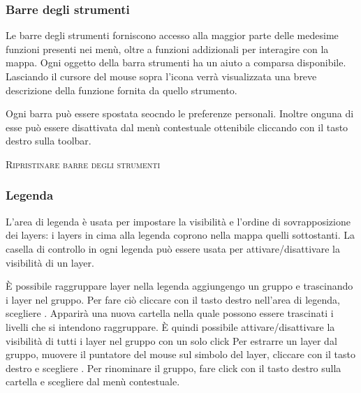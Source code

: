 
\subsubsection{Barre degli strumenti}\label{label_toolbars}

Le barre degli strumenti forniscono accesso alla maggior parte delle medesime funzioni presenti nei menù,
oltre a funzioni addizionali per interagire con la mappa. Ogni oggetto della barra strumenti
ha un aiuto a comparsa disponibile. Lasciando il cursore del mouse sopra l'icona verrà
visualizzata una breve descrizione della funzione fornita da quello strumento.

Ogni barra può essere spostata seocndo le preferenze personali. Inoltre onguna di esse
può essere disattivata dal menù contestuale ottenibile cliccando con il tasto destro
sulla toolbar.

\begin{Tip}
\caption{\textsc{Ripristinare barre degli strumenti}} 
\end{Tip}

\subsubsection{Legenda}\label{label_legend}

L'area di legenda è usata per impostare la visibilità e l'ordine di sovrapposizione dei layers:
i layers in cima alla legenda coprono nella mappa quelli sottostanti.
La casella di controllo in ogni legenda può essere usata per attivare/disattivare la 
visibilità di un layer.

È possibile raggruppare layer nella legenda aggiungengo un gruppo e trascinando i layer nel gruppo.
Per fare ciò cliccare con il tasto destro nell'area di legenda, scegliere . 
Apparirà una nuova cartella nella quale possono essere trascinati i livelli che si intendono raggruppare.
È quindi possibile attivare/disattivare la visibilità di tutti i layer nel gruppo con un solo click
Per estrarre un layer dal gruppo, muovere il puntatore del mouse sul simbolo del layer,
cliccare con il tasto destro e scegliere .
Per rinominare il gruppo, fare click con il tasto destro sulla cartella e scegliere
 dal menù contestuale.

